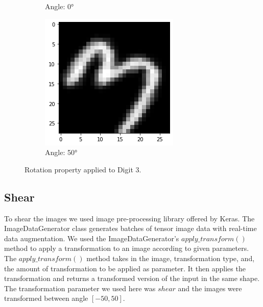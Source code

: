 \begin{figure}[!htbp]
\begin{subfigure}[b]{.3\textwidth}
            \caption{Angle: \ang{0}}
            \label{fig:Rotate-misclass0}
        \end{subfigure}%
        \begin{subfigure}[b]{.3\textwidth}
            \centering
            \includegraphics[width=\linewidth]{images/rotate3.png}
            \caption{Angle: \ang{50}}
            \label{fig:Rotate-misclass0}
        \end{subfigure}
        \caption{Rotation property applied to Digit 3.}
        \label{fig:Rotate-misclassifications}
    \end{figure}
    \FloatBarrier

\subsection{Shear} 
To shear the images we used image pre-processing library offered by Keras. The ImageDataGenerator class generates batches of tensor image data with real-time data augmentation. We used the ImageDataGenerator's $apply\_transform()$ method to apply a transformation to an image according to given parameters. The $apply\_transform()$ method takes in the image, transformation type, and, the amount of transformation to be applied as parameter. It then applies the transformation and returns a transformed version of the input in the same shape.
The transformation parameter we used here was $shear$ and the images were transformed between angle $[-50, 50]$.

